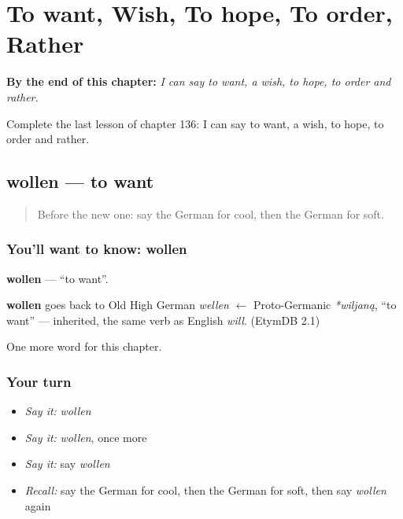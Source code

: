 
\chapter{To want, Wish, To hope, To order, Rather}
\label{ch:ge-to-want-wish-to-hope-to-order-rather}

\begin{chapteropening}
\textbf{By the end of this chapter:} \emph{I can say to want, a wish, to hope, to order and rather.}

Complete the last lesson of chapter 136: I can say to want, a wish, to hope, to order and rather.
\end{chapteropening}

\section[wollen]{wollen — to want}

\label{lesson:GE-C136-wollen}



\begin{quote}
Before the new one: say the German for cool, then the German for soft.
\end{quote}

\subsection*{You'll want to know: wollen}
\textbf{wollen} — \textquotedblleft{}to want\textquotedblright{}.

\begin{cousinweb}
\textbf{wollen} goes back to Old High German \emph{wellen} $\leftarrow$ Proto-Germanic \emph{*wiljaną}, \textquotedblleft{}to want\textquotedblright{} — inherited, the same verb as English \emph{will}. (EtymDB 2.1)
\end{cousinweb}

\begin{grammarlens}[title={What you've built}]
One more word for this chapter.
\end{grammarlens}

\subsection*{Your turn}
\begin{itemize}
\raggedright
  \item \emph{Say it:} \emph{wollen}
  \item \emph{Say it:} \emph{wollen}, once more
  \item \emph{Say it:} say \emph{wollen}
  \item \emph{Recall:} say the German for cool, then the German for soft, then say \emph{wollen} again
\end{itemize}

